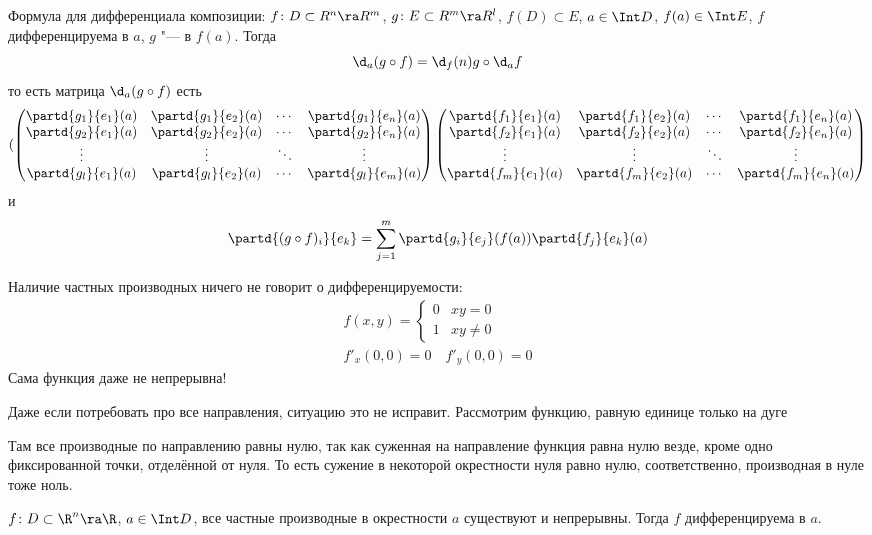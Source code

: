 \begin{conseq}
	Формула для дифференциала композиции:
	$f\colon D \subset R^n \ra R^m$, $g\colon E \subset R^m \ra R^l$, $f(D) \subset E$, $a \in \Int D$, $f(a) \in \Int E$,
	$f$ дифференцируема в $a$, $g$ "--- в $f(a)$.
	Тогда
	\[ \d_a(g \circ f) = \d_f(n) g \circ \d_a f \]
	то есть матрица $\d_a (g \circ f)$ есть
	\[(\begin{pmatrix}
		\partd{g_1}{e_1}(a) & \partd{g_1}{e_2}(a)
			&\cdots& \partd{g_1}{e_n}(a) \\
		\partd{g_2}{e_1}(a) & \partd{g_2}{e_2}(a)
			&\cdots& \partd{g_2}{e_n}(a) \\
		\vdots & \vdots & \ddots & \vdots \\
		\partd{g_l}{e_1}(a) & \partd{g_l}{e_2}(a)
			&\cdots& \partd{g_l}{e_m}(a) \\
	\end{pmatrix}\begin{pmatrix}
		\partd{f_1}{e_1}(a) & \partd{f_1}{e_2}(a)
			&\cdots& \partd{f_1}{e_n}(a) \\
		\partd{f_2}{e_1}(a) & \partd{f_2}{e_2}(a)
			&\cdots& \partd{f_2}{e_n}(a) \\
		\vdots & \vdots & \ddots & \vdots \\
		\partd{f_m}{e_1}(a) & \partd{f_m}{e_2}(a)
			&\cdots& \partd{f_m}{e_n}(a) \\
	\end{pmatrix}\]
	и
	\[ \partd{(g \circ f)_i}{e_k} = \sum_{j = 1}^m \partd{g_i}{e_j} (f(a)) \partd{f_j}{e_k} (a) \]
\end{conseq}

\begin{Rem}
	Наличие частных производных ничего не говорит о дифференцируемости:
	\begin{gather*}
		f(x, y) = \begin{cases} 0 & xy = 0 \\ 1 & xy \ne 0 \end{cases} \\
		f'_x(0, 0) = 0 \quad f'_y(0, 0) = 0
	\end{gather*}
	Сама функция даже не непрерывна!

	Даже если потребовать про все направления, ситуацию это не исправит. Рассмотрим функцию, равную единице только на дуге

	\begin{center}
	
	\end{center}

	Там все производные по направлению равны нулю, так как суженная на направление функция равна нулю везде, кроме одно фиксированной точки, отделённой от нуля.
	То есть сужение в некоторой окрестности нуля равно нулю, соответственно, производная в нуле тоже ноль.
\end{Rem}

\begin{theorem}
	$f\colon D \subset \R^n \ra \R$, $a \in \Int D$, все частные производные в окрестности $a$ существуют и непрерывны.
	Тогда $f$ дифференцируема в $a$.
\end{theorem}
